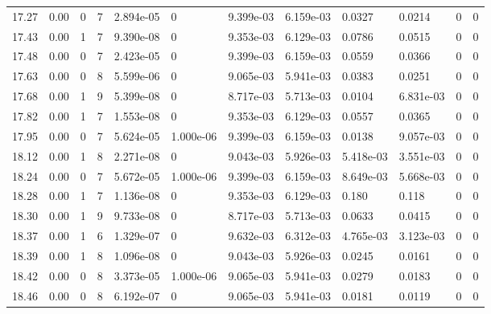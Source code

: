 \documentclass[preview]{standalone}
\begin{document}
{{{{{{\begin{tabular}{L{1.2cm}C{1.2cm} C{0.3cm}C{0.5cm} C{1.4cm}C{1.4cm} C{1.4cm}C{1.4cm} C{1.6cm}C{1.6cm} C{1.6cm}C{1.6cm}}
  17.27  &  0.00  & 0     &  7 &  2.894e-05  & 0  &  9.399e-03&   6.159e-03& 0.0327 & 0.0214   &  0 & 0  \\ 
  17.43  &  0.00  & 1     &  7 &  9.390e-08  & 0  &  9.353e-03&   6.129e-03& 0.0786 & 0.0515   &  0 & 0  \\ 
  17.48  &  0.00  & 0     &  7 &  2.423e-05  & 0  &  9.399e-03&   6.159e-03& 0.0559 & 0.0366   &  0 & 0  \\ 
  17.63  &  0.00  & 0     &  8 &  5.599e-06  & 0  &  9.065e-03&   5.941e-03& 0.0383 & 0.0251   &  0 & 0  \\ 
  17.68  &  0.00  & 1     &  9 &  5.399e-08  & 0  &  8.717e-03&   5.713e-03& 0.0104 & 6.831e-03   &  0 & 0  \\ 
  17.82  &  0.00  & 1     &  7 &  1.553e-08  & 0  &  9.353e-03&   6.129e-03& 0.0557 & 0.0365   &  0 & 0  \\ 
  17.95  &  0.00  & 0     &  7 &  5.624e-05  & 1.000e-06  &  9.399e-03&   6.159e-03& 0.0138 & 9.057e-03   &  0 & 0  \\ 
  18.12  &  0.00  & 1     &  8 &  2.271e-08  & 0  &  9.043e-03&   5.926e-03& 5.418e-03 & 3.551e-03   &  0 & 0  \\ 
  18.24  &  0.00  & 0     &  7 &  5.672e-05  & 1.000e-06  &  9.399e-03&   6.159e-03& 8.649e-03 & 5.668e-03   &  0 & 0  \\ 
  18.28  &  0.00  & 1     &  7 &  1.136e-08  & 0  &  9.353e-03&   6.129e-03& 0.180 & 0.118   &  0 & 0  \\ 
  18.30  &  0.00  & 1     &  9 &  9.733e-08  & 0  &  8.717e-03&   5.713e-03& 0.0633 & 0.0415   &  0 & 0  \\ 
  18.37  &  0.00  & 1     &  6 &  1.329e-07  & 0  &  9.632e-03&   6.312e-03& 4.765e-03 & 3.123e-03   &  0 & 0  \\ 
  18.39  &  0.00  & 1     &  8 &  1.096e-08  & 0  &  9.043e-03&   5.926e-03& 0.0245 & 0.0161   &  0 & 0  \\ 
  18.42  &  0.00  & 0     &  8 &  3.373e-05  & 1.000e-06  &  9.065e-03&   5.941e-03& 0.0279 & 0.0183   &  0 & 0  \\ 
  18.46  &  0.00  & 0     &  8 &  6.192e-07  & 0  &  9.065e-03&   5.941e-03& 0.0181 & 0.0119   &  0 & 0  \\ 
\hline 
\end{tabular} 

}}}}}}
\end{document}
